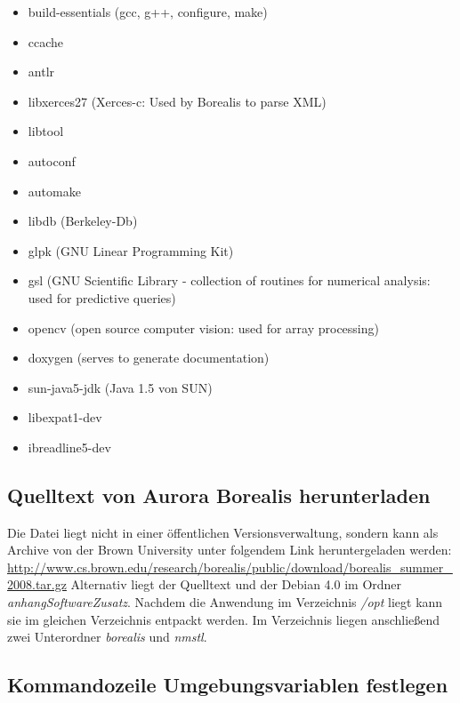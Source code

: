\begin{itemize}
	\item build-essentials (gcc, g++, configure, make)
	\item ccache
	\item antlr
	\item libxerces27 (Xerces-c: Used by Borealis to parse XML)
	\item libtool
	\item autoconf
	\item automake
	\item libdb (Berkeley-Db)
	\item glpk (GNU Linear Programming Kit)
	\item gsl (GNU Scientific Library - collection of routines for numerical analysis: used for predictive queries)
	\item opencv (open source computer vision: used for array processing)
	\item doxygen (serves to generate documentation)
	\item sun-java5-jdk (Java 1.5 von SUN)
	\item libexpat1-dev
	\item ibreadline5-dev
\end{itemize}


\subsection{Quelltext von Aurora Borealis herunterladen}

Die Datei liegt nicht in einer öffentlichen Versionsverwaltung, sondern kann als Archive von der Brown University unter folgendem Link heruntergeladen werden:
\url{http://www.cs.brown.edu/research/borealis/public/download/borealis_summer_2008.tar.gz}
Alternativ liegt der Quelltext und der Debian 4.0 im Ordner \textit{anhangSoftwareZusatz}. Nachdem die Anwendung im Verzeichnis \textit{/opt} liegt kann sie im gleichen Verzeichnis entpackt werden. Im Verzeichnis liegen anschließend zwei Unterordner \textit{borealis} und \textit{nmstl}.


\subsection{Kommandozeile Umgebungsvariablen festlegen}

